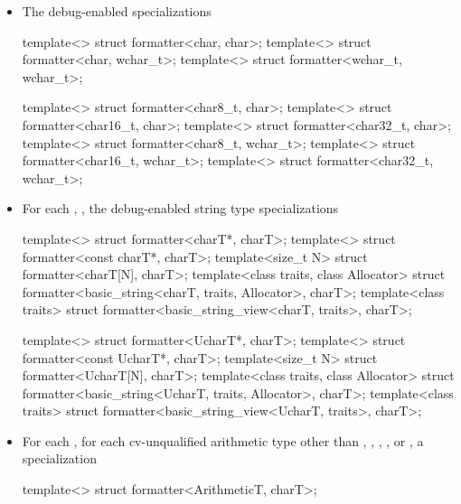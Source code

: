 \documentclass{wg21}
\begin{document}
\begin{itemize}
    \item
    The debug-enabled specializations
    \begin{codeblock}
        template<> struct formatter<char, char>;
        template<> struct formatter<char, wchar_t>;
        template<> struct formatter<wchar_t, wchar_t>;\end{codeblock}\begin{addedblock}\begin{codeblock}
        template<> struct formatter<char8_t, char>;
        template<> struct formatter<char16_t, char>;
        template<> struct formatter<char32_t, char>;
        template<> struct formatter<char8_t,  wchar_t>;
        template<> struct formatter<char16_t, wchar_t>;
        template<> struct formatter<char32_t, wchar_t>;
    \end{codeblock}
    \end{addedblock}

    \item
    For each , ,
    the debug-enabled string type specializations
    \begin{codeblock}
        template<> struct formatter<charT*, charT>;
        template<> struct formatter<const charT*, charT>;
        template<size_t N> struct formatter<charT[N], charT>;
        template<class traits, class Allocator>
        struct formatter<basic_string<charT, traits, Allocator>, charT>;
        template<class traits>
        struct formatter<basic_string_view<charT, traits>, charT>;\end{codeblock}\begin{addedblock}\begin{codeblock}
        template<> struct formatter<UcharT*, charT>;
        template<> struct formatter<const UcharT*, charT>;
        template<size_t N> struct formatter<UcharT[N], charT>;
        template<class traits, class Allocator>
        struct formatter<basic_string<UcharT, traits, Allocator>, charT>;
        template<class traits>
        struct formatter<basic_string_view<UcharT, traits>, charT>;
        \end{codeblock}
    \end{addedblock}

    \item
    For each ,
    for each cv-unqualified arithmetic type 
    other than
    ,
    ,
    ,
    , or
    ,
    a specialization
    \begin{codeblock}
        template<> struct formatter<ArithmeticT, charT>;
    \end{codeblock}


\end{itemize}
\end{document}
